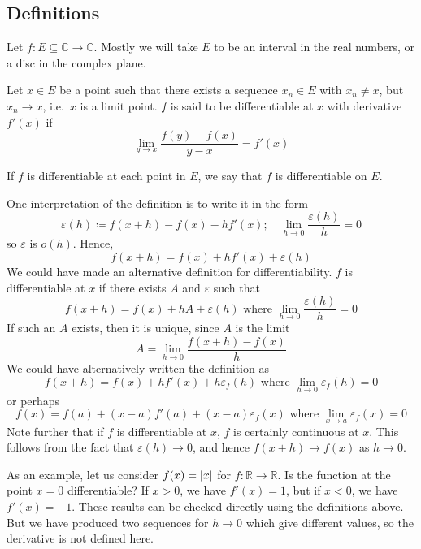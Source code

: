 \subsection{Definitions}
Let \(f \colon E \subseteq \mathbb C \to \mathbb C\).
Mostly we will take \(E\) to be an interval in the real numbers, or a disc in the complex plane.
\begin{definition}
	Let \(x \in E\) be a point such that there exists a sequence \(x_n \in E\) with \(x_n \neq x\), but \(x_n \to x\), i.e.\ \(x\) is a limit point.
	\(f\) is said to be differentiable at \(x\) with derivative \(f'(x)\) if
	\[
		\lim_{y \to x} \frac{f(y) - f(x)}{y - x} = f'(x)
	\]
\end{definition}
If \(f\) is differentiable at each point in \(E\), we say that \(f\) is differentiable on \(E\).
\begin{remark}
	One interpretation of the definition is to write it in the form
	\[
		\varepsilon(h) \coloneq f(x+h) - f(x) - hf'(x);\quad \lim_{h \to 0} \frac{\varepsilon(h)}{h} = 0
	\]
	so \(\varepsilon\) is \(o(h)\).
	Hence,
	\[
		f(x+h) = f(x) + hf'(x) + \varepsilon(h)
	\]
	We could have made an alternative definition for differentiability.
	\(f\) is differentiable at \(x\) if there exists \(A\) and \(\varepsilon\) such that
	\[
		f(x+h) = f(x) + hA + \varepsilon(h) \text{ where } \lim_{h \to 0} \frac{\varepsilon(h)}{h} = 0
	\]
	If such an \(A\) exists, then it is unique, since \(A\) is the limit
	\[
		A = \lim_{h \to 0} \frac{f(x + h) - f(x)}{h}
	\]
	We could have alternatively written the definition as
	\[
		f(x+h) = f(x) + hf'(x) + h\varepsilon_f(h) \text{ where } \lim_{h \to 0} \varepsilon_f(h) = 0
	\]
	or perhaps
	\[
		f(x) = f(a) + (x-a)f'(a) + (x-a)\varepsilon_f(x) \text{ where } \lim_{x \to a} \varepsilon_f(x) = 0
	\]
	Note further that if \(f\) is differentiable at \(x\), \(f\) is certainly continuous at \(x\).
	This follows from the fact that \(\varepsilon(h) \to 0\), and hence \(f(x+h) \to f(x)\) as \(h \to 0\).
\end{remark}
As an example, let us consider \(f(x) = \abs{x}\) for \(f \colon \mathbb R \to \mathbb R\).
Is the function at the point \(x=0\) differentiable?
If \(x > 0\), we have \(f'(x) = 1\), but if \(x < 0\), we have \(f'(x) = -1\).
These results can be checked directly using the definitions above.
But we have produced two sequences for \(h \to 0\) which give different values, so the derivative is not defined here.


